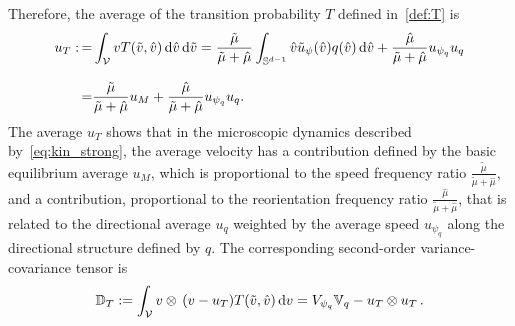 \documentclass[a4paper]{article}
\theoremstyle{Theorem}\newtheorem{proposition}{Proposition}[section]
\theoremstyle{Remark}\newtheorem{remark}{Remark}[section]
\theoremstyle{Theorem}\newtheorem{theorem}{Theorem}[section]
\newcommand{\hv}{\hat{v}}
\newcommand{\tv}{\tilde{v}}
\newcommand{\hmu}{\hat{\mu}}
\newcommand{\tmu}{\tilde{\mu}}
\newcommand{\intS}{\int_{\mathbb{S}^{d-1}}}
\newcommand{\intV}{\int_{\mathcal{V}}}
\begin{document}
Therefore, the average of the transition probability $T$ defined in~\eqref{def:T} is
\begin{equation}\label{u_T}
\begin{split}
    u_T :\,=& \intV v T(\tv,\hv) \, {\rm d} \hv \, {\rm d} \tv= \dfrac{\tmu}{\tmu+\hmu}\intS \hv\tilde{u}_{\psi}(\hv) q(\hv)  \, {\rm d} \hv+\dfrac{\hmu}{\tmu+\hmu} u_{\psi_q}u_q\\[0.3cm]
    =&\dfrac{\tmu}{\tmu+\hmu} u_M+\dfrac{\hmu}{\tmu+\hmu} u_{\psi_q}u_q.
    \end{split}
\end{equation}
The average $u_T$ shows that in the microscopic dynamics described by~\eqref{eq:kin_strong}, the average velocity has a contribution defined by the basic equilibrium average $u_M$, which is proportional to the speed frequency ratio $\frac{\tmu}{\tmu+\hmu}$, and a contribution, proportional to the reorientation frequency ratio $\frac{\hmu}{\tmu+\hmu}$, that is related to the directional average $u_q$ weighted by the average speed $u_{\psi_q}$ along the directional structure defined by $q$.
The corresponding second-order variance-covariance tensor is
\begin{equation}\label{D_T}
    \mathbb{D}_T:=\intV v\otimes \,(v-u_T)T(\tv,\hv)\,{\rm d}v=V_{\psi_q}\mathbb{V}_q-u_T\otimes u_T\,.
\end{equation}
\end{document}
